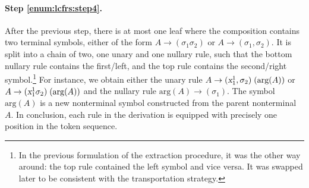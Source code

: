\documentclass[../../document.tex]{subfiles}
\begin{document}


    \paragraph{Step \ref{enum:lcfrs:step4}.}
    After the previous step, there is at most one leaf where the  composition contains two terminal symbols, either of the form \(A \to (\sigma_1 \sigma_2)\) or \(A \to (\sigma_1, \sigma_2)\).
    It is split into a chain of two, one unary and one nullary rule, such that the bottom nullary rule contains the first/left, and the top rule contains the second/right symbol.\footnote{
        In the previous formulation of the extraction procedure, it was the other way around: the top rule contained the left symbol and vice versa.
        It was swapped later to be consistent with the transportation strategy.
    }
    For instance, we obtain either the unary rule \(A \to (\textsl{x}_1^1, \sigma_2)\;(\text{arg}(A))\) or \(A \to (\textsl{x}_1^1 \sigma_2)\;(\text{arg}(A))\) and the nullary rule \(\text{arg}(A) \to (\sigma_1)\).
    The symbol \(\text{arg}(A)\) is a new nonterminal symbol constructed from the parent  nonterminal \(A\).
    In conclusion, each rule in the derivation is equipped with precisely one position in the token sequence.
\end{document}
